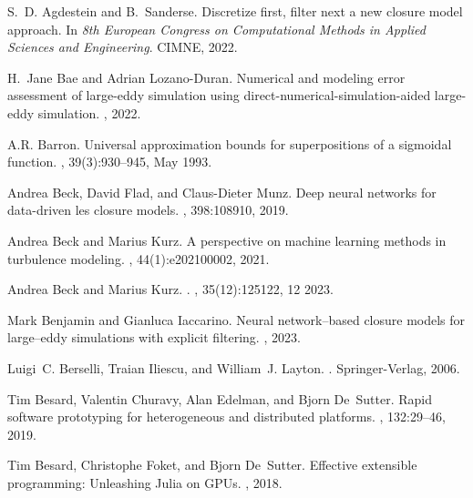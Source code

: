 \documentclass[preprint]{elsarticle}
\begin{document}

% 
% 
\begin{thebibliography}{10}

S.~D. Agdestein and B.~Sanderse.
\newblock Discretize first, filter next {\textendash} a new closure model approach.
\newblock In {\em 8th European Congress on Computational Methods in Applied Sciences and Engineering}. {CIMNE}, 2022.

H.~Jane Bae and Adrian Lozano-Duran.
\newblock Numerical and modeling error assessment of large-eddy simulation using direct-numerical-simulation-aided large-eddy simulation.
, 2022.

A.R. Barron.
\newblock Universal approximation bounds for superpositions of a sigmoidal function.
, 39(3):930–945, May 1993.

Andrea Beck, David Flad, and Claus-Dieter Munz.
\newblock Deep neural networks for data-driven les closure models.
, 398:108910, 2019.

Andrea Beck and Marius Kurz.
\newblock A perspective on machine learning methods in turbulence modeling.
, 44(1):e202100002, 2021.

Andrea Beck and Marius Kurz.
.
, 35(12):125122, 12 2023.

Mark Benjamin and Gianluca Iaccarino.
\newblock Neural network–based closure models for large–eddy simulations with explicit filtering.
, 2023.

Luigi~C. Berselli, Traian Iliescu, and William~J. Layton.
.
\newblock Springer-Verlag, 2006.

Tim Besard, Valentin Churavy, Alan Edelman, and Bjorn De~Sutter.
\newblock Rapid software prototyping for heterogeneous and distributed platforms.
, 132:29--46, 2019.

Tim Besard, Christophe Foket, and Bjorn De~Sutter.
\newblock Effective extensible programming: Unleashing {Julia} on {GPUs}.
, 2018.


\end{thebibliography}
\end{document}
